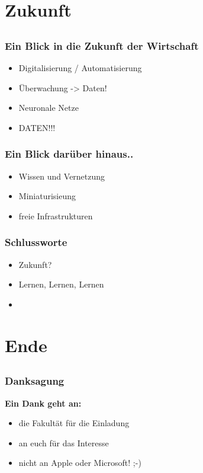 \documentclass[12pt]{beamer}
\begin{document}
\section{Zukunft}
  \subsection{}
  
\begin{frame}
	\frametitle{Ein Blick in die Zukunft der Wirtschaft}
	\begin{itemize}
		\item<4-> Digitalisierung / Automatisierung
    \item<1-> Überwachung -> Daten!
		\item<2-> Neuronale Netze
		\item<3-> DATEN!!!		
	\end{itemize}
\end{frame}

\begin{frame}
	\frametitle{Ein Blick darüber hinaus..}
	\begin{itemize}
		\item<1-> Wissen und Vernetzung
		\item<2-> Miniaturisieung
		\item<3-> freie Infrastrukturen
	\end{itemize}
\end{frame}


\begin{frame}
	\frametitle{Schlussworte}
	\begin{itemize}
		\item<1-> Zukunft?
		\item<2-> Lernen, Lernen, Lernen
		\item<3->  
	\end{itemize}
\end{frame}

\section{Ende}
	\subsection{}

\begin{frame}
	\frametitle{Danksagung}
	\begin{center}
		\textbf{Ein Dank geht an:}
		\begin{itemize}
			\item<1-> die Fakultät für die Einladung
			\item<2-> an euch für das Interesse
			\item<2-> nicht an Apple oder Microsoft! ;-)
		\end{itemize}
	\end{center}
\end{frame}
  
\end{document}
